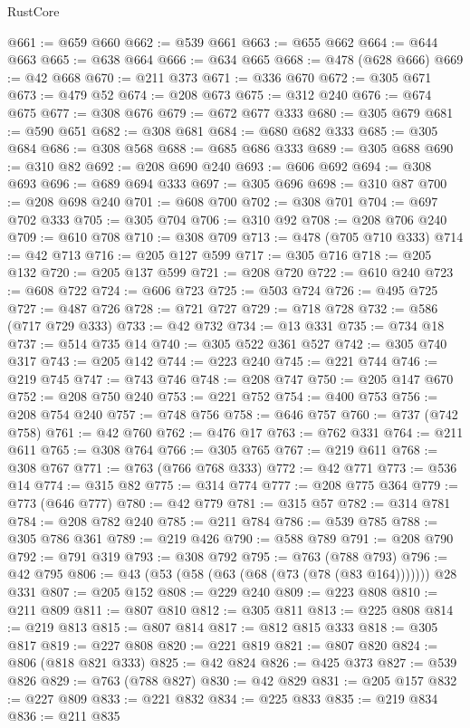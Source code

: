 \begin{lexlean}{RustCore}
\begin{coremodule}
@661 := @659 @660
@662 := @539 @661
@663 := @655 @662
@664 := @644 @663
@665 := @638 @664
@666 := @634 @665
@668 := @478 (@628 @666)
@669 := @42 @668
@670 := @211 @373
@671 := @336 @670
@672 := @305 @671
@673 := @479 @52
@674 := @208 @673
@675 := @312 @240
@676 := @674 @675
@677 := @308 @676
@679 := @672 @677 @333
@680 := @305 @679
@681 := @590 @651
@682 := @308 @681
@684 := @680 @682 @333
@685 := @305 @684
@686 := @308 @568
@688 := @685 @686 @333
@689 := @305 @688
@690 := @310 @82
@692 := @208 @690 @240
@693 := @606 @692
@694 := @308 @693
@696 := @689 @694 @333
@697 := @305 @696
@698 := @310 @87
@700 := @208 @698 @240
@701 := @608 @700
@702 := @308 @701
@704 := @697 @702 @333
@705 := @305 @704
@706 := @310 @92
@708 := @208 @706 @240
@709 := @610 @708
@710 := @308 @709
@713 := @478 (@705 @710 @333)
@714 := @42 @713
@716 := @205 @127 @599
@717 := @305 @716
@718 := @205 @132
@720 := @205 @137 @599
@721 := @208 @720
@722 := @610 @240
@723 := @608 @722
@724 := @606 @723
@725 := @503 @724
@726 := @495 @725
@727 := @487 @726
@728 := @721 @727
@729 := @718 @728
@732 := @586 (@717 @729 @333)
@733 := @42 @732
@734 := @13 @331
@735 := @734 @18
@737 := @514 @735 @14
@740 := @305 @522 @361 @527
@742 := @305 @740 @317
@743 := @205 @142
@744 := @223 @240
@745 := @221 @744
@746 := @219 @745
@747 := @743 @746
@748 := @208 @747
@750 := @205 @147 @670
@752 := @208 @750 @240
@753 := @221 @752
@754 := @400 @753
@756 := @208 @754 @240
@757 := @748 @756
@758 := @646 @757
@760 := @737 (@742 @758)
@761 := @42 @760
@762 := @476 @17
@763 := @762 @331
@764 := @211 @611
@765 := @308 @764
@766 := @305 @765
@767 := @219 @611
@768 := @308 @767
@771 := @763 (@766 @768 @333)
@772 := @42 @771
@773 := @536 @14
@774 := @315 @82
@775 := @314 @774
@777 := @208 @775 @364
@779 := @773 (@646 @777)
@780 := @42 @779
@781 := @315 @57
@782 := @314 @781
@784 := @208 @782 @240
@785 := @211 @784
@786 := @539 @785
@788 := @305 @786 @361
@789 := @219 @426
@790 := @588 @789
@791 := @208 @790
@792 := @791 @319
@793 := @308 @792
@795 := @763 (@788 @793)
@796 := @42 @795
@806 := @43 (@53 (@58 (@63 (@68 (@73 (@78 (@83 @164))))))) @28 @331
@807 := @205 @152
@808 := @229 @240
@809 := @223 @808
@810 := @211 @809
@811 := @807 @810
@812 := @305 @811
@813 := @225 @808
@814 := @219 @813
@815 := @807 @814
@817 := @812 @815 @333
@818 := @305 @817
@819 := @227 @808
@820 := @221 @819
@821 := @807 @820
@824 := @806 (@818 @821 @333)
@825 := @42 @824
@826 := @425 @373
@827 := @539 @826
@829 := @763 (@788 @827)
@830 := @42 @829
@831 := @205 @157
@832 := @227 @809
@833 := @221 @832
@834 := @225 @833
@835 := @219 @834
@836 := @211 @835

\end{coremodule}
\end{lexlean}
